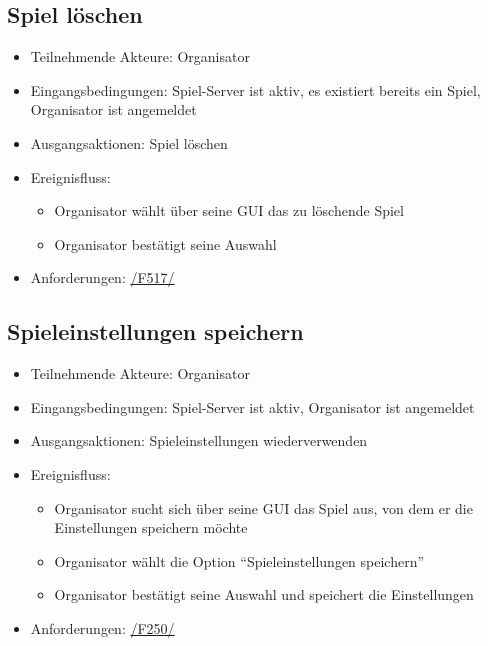 \documentclass[a4paper]{scrreprt}
\begin{document}
    \subsection{Spiel löschen}
    \begin{itemize}
        \item Teilnehmende Akteure: \Gls{Organisator}
        \item Eingangsbedingungen: \Gls{Spiel-Server} ist aktiv, es existiert bereits ein Spiel, \Gls{Organisator} ist angemeldet
        \item Ausgangsaktionen: \Gls{Spiel} löschen
        \item Ereignisfluss:
        \begin{itemize}
            \item \Gls{Organisator} wählt über seine GUI das zu löschende Spiel
            \item \Gls{Organisator} bestätigt seine Auswahl
        \end{itemize}
        \item Anforderungen: \hyperlink{F517}{/F517/}
    \end{itemize}

    \subsection{Spieleinstellungen speichern}
    \begin{itemize}
        \item Teilnehmende Akteure: \Gls{Organisator}
        \item Eingangsbedingungen: \Gls{Spiel-Server} ist aktiv, \Gls{Organisator} ist angemeldet
        \item Ausgangsaktionen: \Gls{Spieleinstellungen} wiederverwenden
        \item Ereignisfluss:
        \begin{itemize}
            \item \Gls{Organisator} sucht sich über seine GUI das \Gls{Spiel} aus, von dem er die Einstellungen speichern möchte
            \item \Gls{Organisator} wählt die Option \enquote{Spieleinstellungen speichern}
            \item \Gls{Organisator} bestätigt seine Auswahl und speichert die Einstellungen
        \end{itemize}
        \item Anforderungen: \hyperlink{F250}{/F250/}
    \end{itemize}
\end{document}
